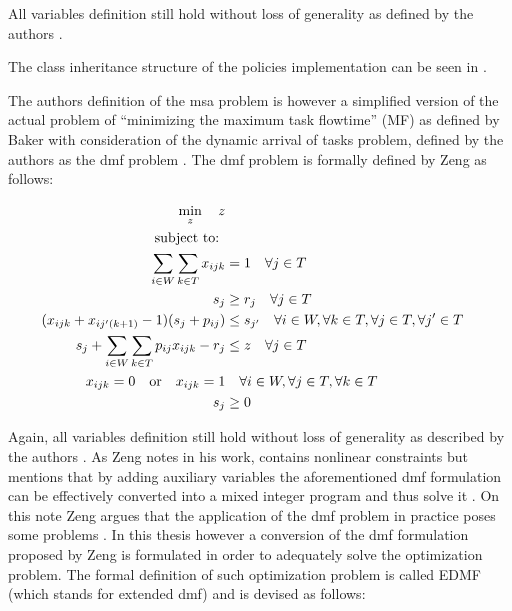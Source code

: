 \documentclass{seal_thesis}
\begin{document}
All variables definition still hold without loss of generality as defined by the authors \cite[pp. 5-7]{Zeng2005}.

The class inheritance structure of the policies implementation can be seen in .


The authors definition of the \gls{msa} problem is however a simplified version of the actual problem of ``minimizing the maximum task flowtime'' (MF) as defined by Baker \cite{Baker1974} with consideration of the dynamic arrival of tasks problem, defined by the authors as the \gls{dmf} problem \cite{Zeng2005}. The \gls{dmf} problem is formally defined by Zeng as follows:

\begin{align}
    \min_z \quad z\\
    \text{subject to: } \notag \\
    \sum_{i \in W} \sum_{k \in T} x_{ijk} &= 1 \quad \forall j \in T\\
    s_j &\geq r_j \quad \forall j \in T\\
    (x_{ijk} + x_{ij'(k+1)} - 1)(s_j + p_{ij}) &\leq s_{j'} \quad \forall i \in W, \forall k \in T, \forall j \in T, \forall j' \in T \label{eq:nonlinear_constraints_dmf}\\
    s_j + \sum_{i \in W} \sum_{k \in T} p_{ij} x_{ijk} - r_j &\leq z \quad \forall j \in T\\
    x_{ijk} = 0 \quad \text{or} \quad x_{ijk} = 1 &\quad \forall i \in W, \forall j \in T, \forall k \in T\\
    s_j &\geq 0
\end{align}

Again, all variables definition still hold without loss of generality as described by the authors \cite[p. 6]{Zeng2005}. As Zeng notes in his work,  contains nonlinear constraints but mentions that by adding auxiliary variables the aforementioned \gls{dmf} formulation can be effectively converted into a mixed integer program and thus solve it \cite[p. 6]{Zeng2005}. On this note Zeng argues that the application of the \gls{dmf} problem in practice poses some problems \cite{Zeng2005}. In this thesis however a conversion of the \gls{dmf} formulation proposed by Zeng is formulated in order to adequately solve the optimization problem. The formal definition of such optimization problem is called EDMF (which stands for extended \gls{dmf}) and is devised as follows:
\end{document}
